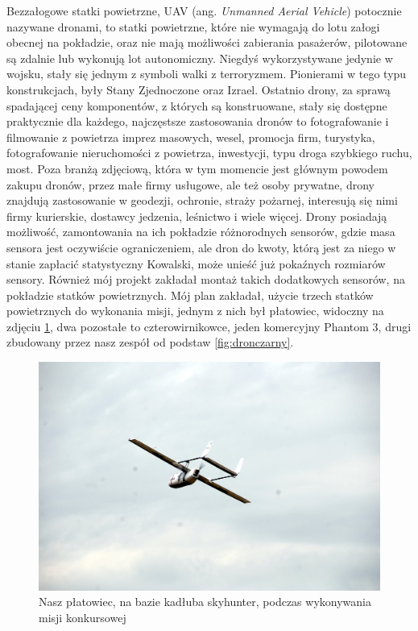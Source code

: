 Bezzałogowe statki powietrzne, UAV (ang. \textit{Unmanned Aerial Vehicle}) potocznie nazywane dronami, to statki powietrzne, które nie wymagają do lotu załogi obecnej na pokładzie, oraz nie mają możliwości zabierania pasażerów, pilotowane są zdalnie lub wykonują lot autonomiczny. Niegdyś wykorzystywane jedynie w wojsku, stały się jednym z symboli walki z terroryzmem. Pionierami w tego typu konstrukcjach, były Stany Zjednoczone oraz Izrael. Ostatnio drony, za sprawą spadającej ceny komponentów, z których są konstruowane, stały się dostępne praktycznie dla każdego, najczęstsze zastosowania dronów to fotografowanie i filmowanie z powietrza imprez masowych, wesel, promocja firm, turystyka, fotografowanie nieruchomości z powietrza, inwestycji, typu droga szybkiego ruchu, most. Poza branżą zdjęciową, która w tym momencie jest głównym powodem zakupu dronów, przez małe firmy usługowe, ale też osoby prywatne, drony znajdują zastosowanie w geodezji, ochronie, straży pożarnej, interesują się nimi firmy kurierskie, dostawcy jedzenia, leśnictwo i wiele więcej. Drony posiadają możliwość, zamontowania na ich pokładzie różnorodnych sensorów, gdzie masa sensora jest oczywiście ograniczeniem, ale dron do kwoty, którą jest za niego w stanie zapłacić statystyczny Kowalski, może unieść już pokaźnych rozmiarów sensory. Również mój projekt zakładał montaż takich dodatkowych sensorów, na pokładzie statków powietrznych. Mój plan zakładał, użycie trzech statków powietrznych do wykonania misji, jednym z nich był płatowiec, widoczny na zdjęciu \ref{fig:skyhunter}, dwa pozostałe to czterowirnikowce, jeden komercyjny Phantom 3, drugi zbudowany przez nasz zespół od podstaw \ref{fig:dronczarny}.

\begin{figure}[!th]
    \centering
    \includegraphics[width=15cm]{zalaczniki/obrazy/skyhunter.jpg}
    \caption{Nasz płatowiec, na bazie kadłuba skyhunter, podczas wykonywania misji konkursowej}
    \label{fig:skyhunter}
\end{figure}

